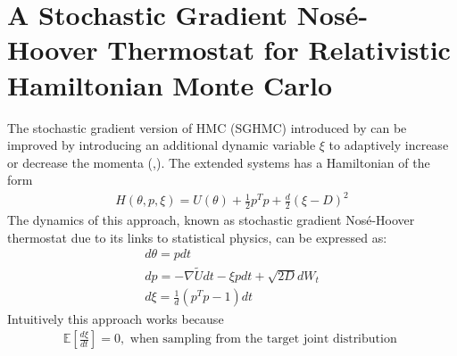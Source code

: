 \section{A Stochastic Gradient Nosé-Hoover Thermostat for Relativistic Hamiltonian Monte Carlo}
The stochastic gradient version of HMC (SGHMC) introduced by \cite{Chen2014} can be improved by introducing an additional dynamic variable $\xi$ to adaptively increase or decrease the momenta (\cite{Ding2014},\cite{Leimkuhler2016}). The extended systems has a Hamiltonian of the form
\begin{eqnarray}
H(\theta,p,\xi) = U(\theta) +\frac{1}{2}p^Tp + \frac{d}{2}(\xi -D)^2\label{eq:thermostatH}
\end{eqnarray}
The dynamics of this approach, known as stochastic gradient Nosé-Hoover thermostat due to its links to statistical physics, can be expressed as:
\begin{eqnarray}
	d\theta = p dt\\
	d p = -\nabla \tilde{U} dt - \xi p dt + \sqrt{2D}dW_t\\
	d\xi = \frac{1}{d}\left(p^Tp -1\right)dt
\end{eqnarray}
 Intuitively this approach works because 
\begin{eqnarray}
  \mathbb{E}\left[\frac{d\xi}{dt}\right]=0, \mbox{ when sampling from the target joint distribution }\label{eq:thermostat}
\end{eqnarray}

